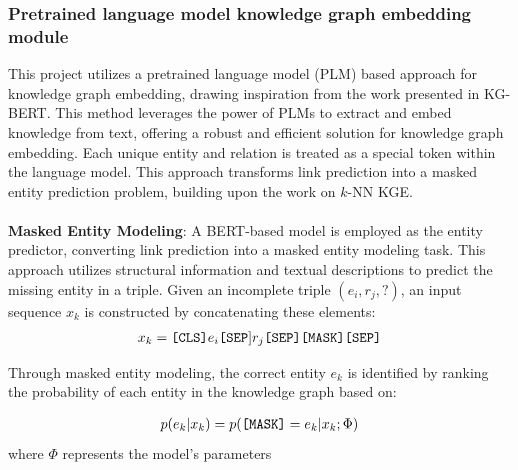 \subsubsection{Pretrained language model knowledge graph embedding module}
This project utilizes a pretrained language model (PLM) based approach for knowledge graph embedding, drawing inspiration from the work presented in KG-BERT\cite{yao2019kg}. This method leverages the power of PLMs to extract and embed knowledge from text, offering a robust and efficient solution for knowledge graph embedding. Each unique entity and relation is treated as a special token within the language model. This approach transforms link prediction into a masked entity prediction problem, building upon the work on $k$-NN KGE\cite{10.1007/978-3-031-44693-1_9}.\\\\
\textbf{Masked Entity Modeling}: A BERT-based model is employed as the entity predictor, converting link prediction into a masked entity modeling task. This approach utilizes structural information and textual descriptions to predict the missing entity in a triple. Given an incomplete triple $(e_i, r_j, ?)$, an input sequence $x_k$ is constructed by concatenating these elements:
\begin{align*}
x_k = \text{\texttt{[CLS]}} e_i \text{\texttt{[SEP}]} r_j \text{\texttt{[SEP]}} \text{\texttt{[MASK]}} \text{\texttt{[SEP]}}
\end{align*}

Through masked entity modeling, the correct entity $e_k$ is identified by ranking the probability of each entity in the knowledge graph based on:

\begin{align}
p(e_k|x_k) = p(\text{\texttt{[MASK]}} = e_k|x_k;\Phi)
\end{align}
where $\Phi$ represents the model's parameters


